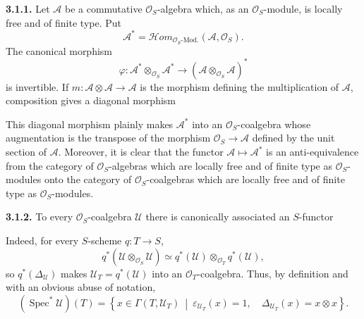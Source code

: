 \medskip
\noindent\textbf{3.1.1.}
\label{sga3:VIIA:3.1.1}
Let \(\mathcal A\) be a commutative \(\mathcal O_S\)-algebra which,
as an \(\mathcal O_S\)-module, is locally free and of finite type.
Put
\[
  \mathcal A^{*}
  =\mathcal Hom_{\mathcal O_S\text{-Mod.}}
    (\mathcal A,\mathcal O_S).
\]
The canonical morphism
\[
  \varphi:\mathcal A^{*}\otimes_{\mathcal O_S}\mathcal A^{*}
  \longrightarrow
  (\mathcal A\otimes_{\mathcal O_S}\mathcal A)^{*}
\]
is invertible. If
\(m:\mathcal A\otimes\mathcal A\to\mathcal A\) is the morphism
defining the multiplication of \(\mathcal A\), composition gives a
diagonal morphism
\begin{center}
  \label{sga3:VIIA:3.1.1-dual-coalgebra-sequence}
  
\end{center}
This diagonal morphism plainly makes \(\mathcal A^{*}\) into an
\(\mathcal O_S\)-coalgebra whose augmentation is the transpose of
the morphism \(\mathcal O_S\to\mathcal A\) defined by the unit
section of \(\mathcal A\). Moreover, it is clear that the functor
\(\mathcal A\mapsto\mathcal A^{*}\) is an anti-equivalence from the
category of \(\mathcal O_S\)-algebras which are locally free and of finite
type as \(\mathcal O_S\)-modules onto the category of
\(\mathcal O_S\)-coalgebras which are locally free and of finite type as
\(\mathcal O_S\)-modules.

\medskip
\noindent\textbf{3.1.2.}
\label{sga3:VIIA:3.1.2}
To every \(\mathcal O_S\)-coalgebra \(\mathcal U\) there is
canonically associated an \(S\)-functor
\begin{center}
  \label{sga3:VIIA:3.1.2-spec-star-functor}
  
\end{center}
Indeed, for every \(S\)-scheme \(q:T\to S\),
\[
  q^{*}(\mathcal U\otimes_{\mathcal O_S}\mathcal U)
  \simeq
  q^{*}(\mathcal U)\otimes_{\mathcal O_T}q^{*}(\mathcal U),
\]
so \(q^{*}(\Delta_{\mathcal U})\) makes
\(\mathcal U_T=q^{*}(\mathcal U)\) into an
\(\mathcal O_T\)-coalgebra. Thus, by definition and with an obvious
abuse of notation,
\[
  (\operatorname{Spec}^{*}\mathcal U)(T)
  =
  \left\{
    x\in\Gamma(T,\mathcal U_T)
    \ \middle|\
    \varepsilon_{\mathcal U_T}(x)=1,\quad
    \Delta_{\mathcal U_T}(x)=x\otimes x
  \right\}.
\]

